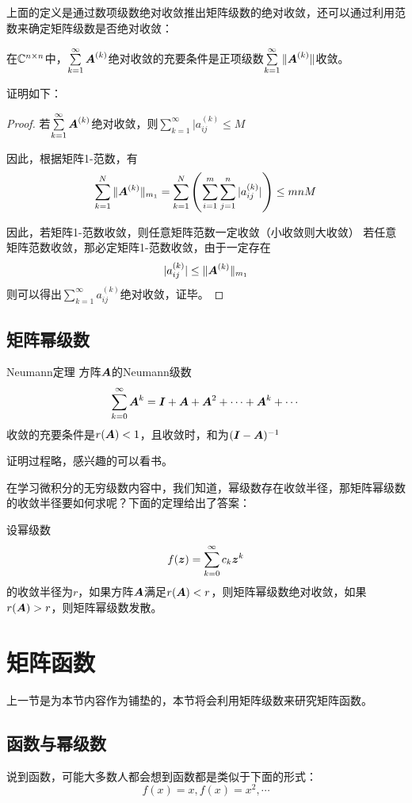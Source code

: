 \documentclass[12pt, a4paper, oneside, UTF8]{ctexbook}
\begin{document}
上面的定义是通过数项级数绝对收敛推出矩阵级数的绝对收敛，还可以通过利用范数来确定矩阵级数是否绝对收敛：
\begin{them}{}{}
    在$\mathbb{C}^{n\times n}$中，$\sum\limits_{k=1}^{\infty}\boldsymbol{A}^{(k)}$绝对收敛的充要条件是正项级数$\sum\limits_{k=1}^{\infty}\Vert\boldsymbol{A}^{(k)}\Vert$收敛。
\end{them}

证明如下：

\begin{proof}

    若$\sum\limits_{k=1}^{\infty}\boldsymbol{A}^{(k)}$绝对收敛，则$\sum\limits_{k=1}^{\infty}|a_{ij}^{(k)}\leq M$

    因此，根据矩阵1-范数，有\[\sum_{k=1}^{N}\Vert\boldsymbol{A}^{(k)}\Vert_{m_1}=\sum_{k=1}^{N}\left(\sum_{i=1}^{m}\sum_{j=1}^{n}|a_{ij}^{(k)}|\right)\leq mnM\]

    因此，若矩阵1-范数收敛，则任意矩阵范数一定收敛（小收敛则大收敛）
若任意矩阵范数收敛，那必定矩阵1-范数收敛，由于一定存在\[|a_{ij}^{(k)}|\leq\Vert\boldsymbol{A}^{(k)}\Vert_{m_1}\]则可以得出$\sum_{k=1}^{\infty}a_{ij}^{(k)}$绝对收敛，证毕。
\end{proof}

\subsection{矩阵幂级数}
\begin{them}{}{Neumann定理}
    方阵$\boldsymbol{A}$的Neumann级数\[\sum_{k=0}^{\infty}\boldsymbol{A}^k=\boldsymbol{I}+\boldsymbol{A}+\boldsymbol{A}^2+\cdots+\boldsymbol{A}^k+\cdots\]收敛的充要条件是$r(\boldsymbol{A})<1$，且收敛时，和为$(\boldsymbol{I}-\boldsymbol{A})^{-1}$
\end{them}

证明过程略，感兴趣的可以看书。

在学习微积分的无穷级数内容中，我们知道，幂级数存在收敛半径，那矩阵幂级数的收敛半径要如何求呢？下面的定理给出了答案：
\begin{them}{}{}
    设幂级数\[f(\boldsymbol{z})=\sum_{k=0}^{\infty}c_k\boldsymbol{z}^k\]的收敛半径为$r$，如果方阵$\boldsymbol{A}$满足$r(\boldsymbol{A})<r$，则矩阵幂级数绝对收敛，如果$r(\boldsymbol{A})>r$，则矩阵幂级数发散。
\end{them}
\section{矩阵函数}
上一节是为本节内容作为铺垫的，本节将会利用矩阵级数来研究矩阵函数。

\subsection{函数与幂级数}
说到函数，可能大多数人都会想到函数都是类似于下面的形式：\[f(x)=x, f(x)=x^2,\cdots\]
\end{document}
